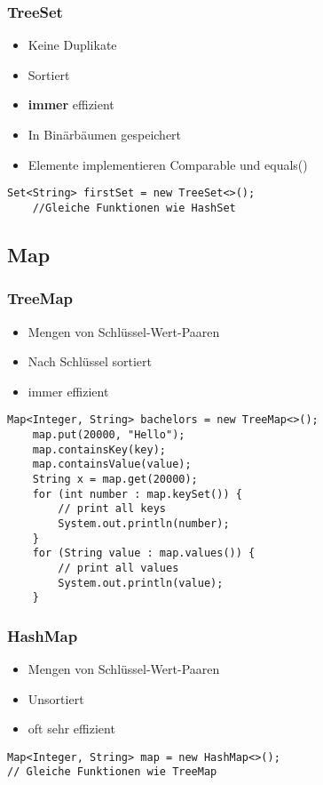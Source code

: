 \begin{multicols*}{5}
		\subsubsection{TreeSet}
		\begin{itemize}
			\item Keine Duplikate
			\item Sortiert
			\item \textbf{immer} effizient
			\item In Binärbäumen gespeichert
			\item Elemente implementieren Comparable und equals()
		\end{itemize}
		\begin{lstlisting}
Set<String> firstSet = new TreeSet<>();
	//Gleiche Funktionen wie HashSet
		\end{lstlisting}
	
	\subsection{Map}
		\subsubsection{TreeMap}
		\begin{itemize}
			\item Mengen von Schlüssel-Wert-Paaren
			\item Nach Schlüssel sortiert
			\item immer effizient
		\end{itemize}
		\begin{lstlisting}
Map<Integer, String> bachelors = new TreeMap<>();
	map.put(20000, "Hello");
	map.containsKey(key);
	map.containsValue(value);
	String x = map.get(20000);
	for (int number : map.keySet()) { 
		// print all keys
		System.out.println(number);
	}
	for (String value : map.values()) { 
		// print all values
		System.out.println(value);
	}
		\end{lstlisting}
		\subsubsection{HashMap}
		\begin{itemize}
			\item Mengen von Schlüssel-Wert-Paaren
			\item Unsortiert
			\item oft sehr effizient
		\end{itemize}
		\begin{lstlisting}
Map<Integer, String> map = new HashMap<>();
// Gleiche Funktionen wie TreeMap
		\end{lstlisting}



\end{multicols*}
